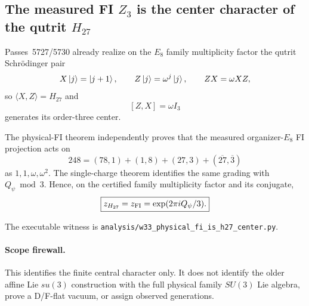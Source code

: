 \subsection*{The measured FI $Z_3$ is the center character of the qutrit $H_{27}$}

Passes~5727/5730 already realize on the $E_8$ family multiplicity factor the
qutrit Schr\"odinger pair
\[
X\left|j\right\rangle=\left|j+1\right\rangle,\qquad Z\left|j\right\rangle=\omega^j\left|j\right\rangle,
\qquad ZX=\omega XZ,
\]
so $\langle X,Z\rangle=H_{27}$ and
\[
[Z,X]=\omega I_3
\]
generates its order-three center.

The physical-FI theorem independently proves that the measured organizer-$E_8$
FI projection acts on
\[
248=(78,1)+(1,8)+(27,3)+(\overline{27},\overline3)
\]
as $1,1,\omega,\omega^2$.  The single-charge theorem identifies the same
grading with $Q_\psi\bmod3$.  Hence, on the certified family multiplicity
factor and its conjugate,
\[
\boxed{z_{H_{27}}=z_{\rm FI}=\exp(2\pi iQ_\psi/3).}
\]

The executable witness is
\texttt{analysis/w33\_physical\_fi\_is\_h27\_center.py}.

\paragraph{Scope firewall.}
This identifies the finite central character only.  It does not identify the
older affine Lie $su(3)$ construction with the full physical family $SU(3)$
Lie algebra, prove a D/F-flat vacuum, or assign observed generations.

